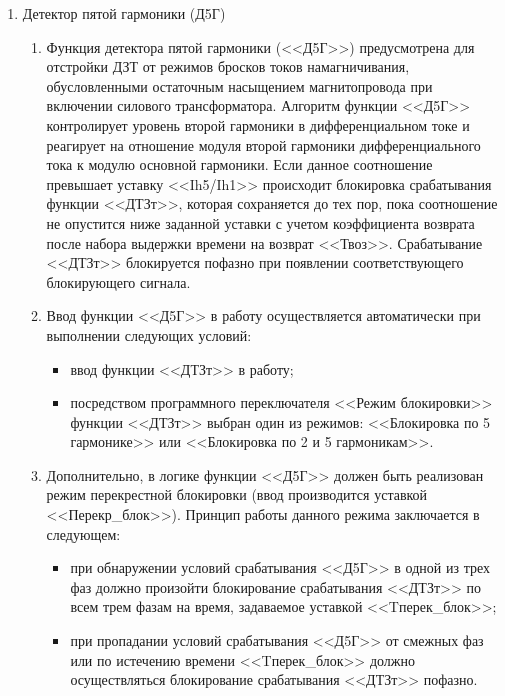 \documentclass[a4paper, 12pt,table, hidelinks, DIV=calc]{extarticle} %
\begin{document}
\begin{enumerate}[label=\arabic{section}.\arabic{subsection}.\arabic{enumi}, labelsep=4pt, leftmargin=0pt, itemindent=57pt, itemsep=0pt, parsep=5pt]
\begin{enumerate}[label=\arabic{section}.\arabic{subsection}.\arabic{enumi}.\arabic*, labelsep=4pt, leftmargin=0em, itemindent=65pt, parsep=0pt]
\end{enumerate}


\item Детектор пятой гармоники (Д5Г)

\begin{enumerate}[label=\arabic{section}.\arabic{subsection}.\arabic{enumi}.\arabic*, labelsep=4pt, leftmargin=0em, itemindent=65pt, parsep=0pt]

\item
Функция детектора пятой гармоники (<<Д5Г>>) предусмотрена для отстройки ДЗТ от режимов бросков токов намагничивания, обусловленными остаточным насыщением магнитопровода при включении силового трансформатора. Алгоритм функции <<Д5Г>> контролирует уровень второй гармоники в дифференциальном токе и реагирует на отношение модуля второй гармоники дифференциального тока к модулю основной гармоники. Если данное соотношение превышает уставку <<Ih5/Ih1>> происходит блокировка срабатывания функции <<ДТЗт>>, которая сохраняется до тех пор, пока соотношение не опустится ниже заданной уставки с учетом коэффициента возврата после набора выдержки времени на возврат <<Твоз>>. Срабатывание <<ДТЗт>> блокируется пофазно при появлении соответствующего блокирующего сигнала. 
\item
Ввод функции <<Д5Г>> в работу осуществляется автоматически при выполнении следующих условий:
\begin{itemize}
\item ввод функции <<ДТЗт>> в работу; 
\item\sloppy посредством программного переключателя <<Режим блокировки>> функции <<ДТЗт>> выбран один из режимов: <<Блокировка по 5 гармонике>> или <<Блокировка по 2 и 5 гармоникам>>.
\end{itemize}
\item
Дополнительно, в логике функции <<Д5Г>> должен быть реализован режим перекрестной блокировки (ввод производится уставкой <<Перекр\_блок>>). Принцип работы данного режима заключается в следующем:
\begin{itemize}
\item при обнаружении условий срабатывания <<Д5Г>> в одной из трех фаз должно произойти блокирование срабатывания <<ДТЗт>> по всем трем фазам на время, задаваемое уставкой <<Tперек\_блок>>;
\item при пропадании условий срабатывания <<Д5Г>> от смежных фаз или по истечению времени <<Tперек\_блок>> должно осуществляться блокирование срабатывания <<ДТЗт>> пофазно.
\end{itemize}


\end{enumerate}
\end{enumerate}
\end{document}
